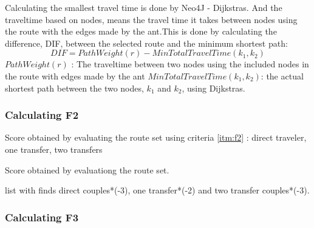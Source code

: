 Calculating the smallest travel time is done by Neo4J - Dijkstras. 
And the traveltime based on nodes, means the travel time it takes between nodes using the route with the edges made by the ant.This is done by calculating the difference, DIF, between the selected route and the minimum shortest path:
$$ DIF = PathWeight(r) - MinTotalTravelTime(k_{1},k_{2})$$
$ PathWeight(r)$ : The traveltime between two nodes using the included nodes in the route with edges made by the ant
\newline
$ MinTotalTravelTime(k_{1},k_{2})$: the actual shortest path between the two nodes, $k_{1}$ and $k_{2}$, using Dijkstras.




\subsubsection{Calculating F2}
Score obtained by evaluating the route set using criteria \ref{itm:f2} : direct traveler, one transfer, two transfers

Score obtained by evaluationg the route set.
 
list with finds direct couples*(-3), one transfer*(-2) and two transfer couples*(-3).


\subsubsection{Calculating F3}



